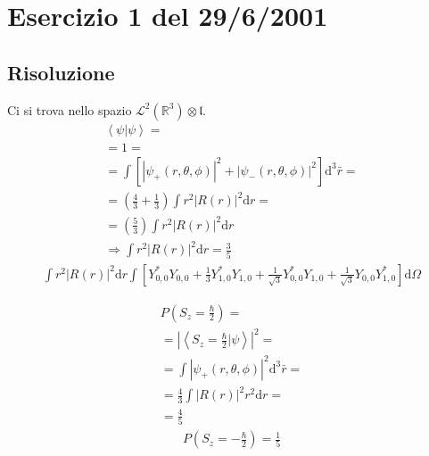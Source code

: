 \section{Esercizio 1 del 29/6/2001} %

\subsection{Risoluzione} %
Ci si trova nello spazio $\mathcal{L}^2\left(\mathbb{R}^3\right)\otimes \mathfrak{l}$.
\begin{equation}\begin{split}
\left\langle \psi |\psi  \right\rangle=\\
=1=
\\=\int{\left[\left|\psi _+\left(r,\theta,\phi\right)\right|^2+\left|\psi _-\left(r,\theta,\phi\right)\right|^2\right]\textrm{d}^3\bar r}=\\
=\left(\frac{4}{3}+\frac{1}{3}\right)\int{r^2|R\left(r\right)|^2\textrm{d}r}=\\
=\left(\frac{5}{3}\right)\int{r^2|R\left(r\right)|^2\textrm{d}r}\\
\Longrightarrow \int{r^2|R\left(r\right)|^2\textrm{d}r}=\frac{3}{5}
\end{split}\end{equation}
\begin{equation}\begin{split}
\int{r^2|R\left(r\right)|^2\textrm{d}r}\int{\left[Y_{0,0}^*Y_{0,0}+\frac{1}{3}Y_{1,0}^*Y_{1,0}+\frac{1}{\sqrt{3}}Y_{0,0}^*Y_{1,0}+\frac{1}{\sqrt{3}}Y_{0,0}Y_{1,0}^*\right]\textrm{d}\Omega}
\end{split}\end{equation}

\begin{equation}\begin{split}
P\left(S_z=\frac{\hbar }{2}\right)=\\
=\left|\left\langle S_z=\frac{\hbar }{2}|\psi  \right\rangle\right|^2=\\
=\int{|\psi _+\left(r,\theta,\phi\right)|^2\textrm{d}^3\bar r}=\\
=\frac{4}{3}\int{|R\left(r\right)|^2r^2\textrm{d}r}=\\
=\frac{4}{5}
\end{split}\end{equation}
\begin{equation}\begin{split}
P\left(S_z=-\frac{\hbar }{2}\right)=\frac{1}{5}
\end{split}\end{equation}

